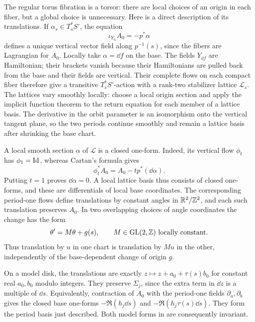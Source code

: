 The regular torus fibration is a torsor: there are local choices of an
origin in each fiber, but a global choice is unnecessary.  Here is a
direct description of its translations.  If $\alpha_s\in T_s^*S^\circ$,
the equation
\[
 \iota_{Y_\alpha}A_0=-p^*\alpha
\]
defines a unique vertical vector field along $p^{-1}(s)$, since the fibers
are Lagrangian for $A_0$.  Locally take $\alpha=\dd f$ on the base.  The
fields $Y_{\dd f}$ are Hamiltonian; their brackets vanish because their
Hamiltonians are pulled back from the base and their fields are vertical.
Their complete flows on each compact fiber therefore give a transitive
$T_s^*S^\circ$-action with a rank-two stabilizer lattice $\mathcal L_s$.
The lattices vary smoothly locally: choose a local origin section and
apply the implicit function theorem to the return equation for each
member of a lattice basis.  The derivative in the orbit parameter is
an isomorphism onto the vertical tangent plane, so the two periods
continue smoothly and remain a lattice basis after shrinking the base
chart.

A local smooth section $\alpha$ of $\mathcal L$ is a closed one-form.
Indeed, its vertical flow $\phi_t$ has $\phi_1=\operatorname{Id}$, whereas Cartan's
formula gives
\[
 \phi_t^*A_0=A_0-tp^*(\dd\alpha).
\]
Putting $t=1$ proves $\dd\alpha=0$.  A local lattice basis thus consists
of closed one-forms, and these are differentials of local base
coordinates.  The corresponding period-one flows define translations
by constant angles in $\mathbb R^2/\mathbb Z^2$, and each such translation preserves
$A_0$.  In two overlapping choices of angle coordinates the change has
the form
\begin{equation}\label{eq:regular-angle-transition}
 \theta'=M\theta+g(s),\qquad M\in\operatorname{GL}(2,\mathbb Z)
 \text{ locally constant}.
\end{equation}
Thus translation by $u$ in one chart is translation by $Mu$ in the
other, independently of the base-dependent change of origin $g$.

On a model disk, the translations are exactly
$z\mapsto z+a_0+\tau(s)b_0$ for constant real $a_0,b_0$ modulo integers.
They preserve $\Sigma_j$, since the extra term in $\dd z$ is a multiple
of $\dd s$.  Equivalently, contraction of $A_0$ with the period-one
fields $\partial_a,\partial_b$ gives the closed base one-forms
$-\Re(h_j\dd s)$ and $-\Re(h_j\tau(s)\dd s)$.  They form the period
basis just described.  Both model forms in
 are consequently invariant.

